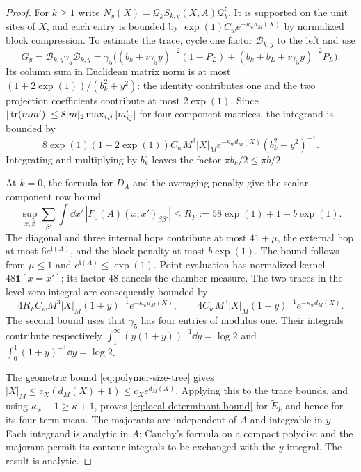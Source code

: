 \begin{proof}
For $k\ge1$ write
$N_y(X)=\mathcal Q_kS_{k,y}(X,A)\mathcal Q_k^\sharp$.
It is supported on the unit sites of $X$, and each entry is bounded
by $\exp(1)C_we^{-\kappa_{\mathrm w}d_M(X)}$ by normalized block
compression. To estimate the trace, cycle one factor
$\mathcal B_{k,y}$ to the left and use
\[
 G_y=\mathcal B_{k,y}\gamma_5\mathcal B_{k,y}
     =\gamma_5\bigl((b_k+i\gamma_5y)^{-2}(1-P_L)
              +(b_k+b_L+i\gamma_5y)^{-2}P_L\bigr).
\]
Its column sum in Euclidean matrix norm is at most
$(1+2\exp(1))/(b_k^2+y^2)$: the identity contributes one and the two
projection coefficients contribute at most $2\exp(1)$. Since
$|\operatorname{tr}(mm')|\le8|m|_2\max_{i,j}|m'_{ij}|$ for four-component
matrices, the integrand is bounded by
\begin{equation}\label{eq:polymer-determinant-trace-bound}
 8\exp(1)(1+2\exp(1))C_wM^3|X|_M
           e^{-\kappa_{\mathrm w}d_M(X)}(b_k^2+y^2)^{-1}.
\end{equation}
Integrating and multiplying by $b_k^2$ leaves the factor
$\pi b_k/2\le\pi b/2$.

At $k=0$, the formula for $D_A$ and the averaging penalty give
the scalar component row bound
\begin{equation}\label{eq:first-step-Dirac-row-bound}
 \sup_{x,\beta}\sum_{\beta'}\int\dd x'\,
                    |F_0(A)(x,x')_{\beta\beta'}|
                      \le R_F:=58\exp(1)+1+b\exp(1).
\end{equation}
The diagonal and three internal hops contribute
at most $41+\mu$, the external hop at most
$6e^{\mathfrak i(A)}$, and the block penalty at most $b\exp(1)$.
The bound follows from $\mu\le1$ and
$e^{\mathfrak i(A)}\le \exp(1)$. Point evaluation has normalized
kernel $48\mathbf1[x=x']$; its factor $48$ cancels the chamber
measure. The two traces in the level-zero integral are consequently
bounded by
\[
 4R_FC_wM^3|X|_M(1+y)^{-1}e^{-\kappa_{\mathrm w}d_M(X)},
 \qquad
 4C_wM^3|X|_M(1+y)^{-1}e^{-\kappa_{\mathrm w}d_M(X)}.
\]
The second bound uses that $\gamma_5$ has four entries of modulus
one. Their integrals contribute respectively
$\int_1^\infty(y(1+y))^{-1}\dd y=\log2$ and
$\int_0^1(1+y)^{-1}\dd y=\log2$.

The geometric bound \eqref{eq:polymer-size-tree} gives
$|X|_M\le c_X(d_M(X)+1)\le c_Xe^{d_M(X)}$.
Applying this to the trace bounds,
and using $\kappa_{\mathrm w}-1\ge\kappa+1$, proves
\eqref{eq:local-determinant-bound} for $\widetilde E_k$ and hence
for its four-term mean. The majorants are independent of $A$ and
integrable in $y$. Each integrand is analytic in $A$; Cauchy's
formula on a compact polydisc and the majorant permit its contour
integrals to be exchanged with the $y$ integral. The result is
analytic.


\end{proof}
